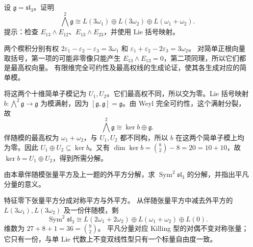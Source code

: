 \begin{exercise}\label{b5:ex:19-adjoint-exterior-square}
	设 \(\mathfrak g=\mathfrak{sl}_3\)。证明
	\[
		\bigwedge^2\mathfrak g \cong L(3\omega_1)\oplus L(3\omega_2)\oplus L(\omega_1+\omega_2).
	\]
	提示：检查 \(E_{13}\wedge E_{12}\)、\(E_{13}\wedge E_{23}\)，并使用 Lie 括号映射。
\end{exercise}
\begin{solution}
	两个楔积分别有权 \(2\varepsilon_1-\varepsilon_2-\varepsilon_3=3\omega_1\) 和 \(\varepsilon_1+\varepsilon_2-2\varepsilon_3=3\omega_2\)。 对简单正根向量取括号，第一项的可能非零像只能产生 \(E_{13}\wedge E_{13}=0\)，第二项同理，所以它们都是最高权向量。 有限维完全可约性及最高权线的生成论证，使其各生成对应的简单模。

	将这两个十维简单子模记为 \(U_1,U_2\)。它们最高权不同，所以交为零。Lie 括号映射 \(b:\bigwedge^2\mathfrak g\to\mathfrak g\) 为模满射，因为 \([\mathfrak g,\mathfrak g]=\mathfrak g\)。由 Weyl 完全可约性，这个满射分裂，故
	\[
		\bigwedge^2\mathfrak g\cong\ker b\oplus\mathfrak g.
	\]
	伴随模的最高权为 \(\omega_1+\omega_2\)，与 \(U_1,U_2\) 都不同构，所以 \(b\) 在这两个简单子模上均为零。因此 \(U_1\oplus U_2\subseteq\ker b\)。又有 \(\dim\ker b=\binom82-8=20=10+10\)，故 \(\ker b=U_1\oplus U_2\)，得到所需分解。
\end{solution}

\begin{exercise}\label{b5:ex:19-adjoint-symmetric-square}
	由本章伴随模张量平方及上一题的外平方分解，求 \(\operatorname{Sym}^2\mathfrak{sl}_3\) 的分解，并指出平凡分量的意义。
\end{exercise}
\begin{solution}
	特征零下张量平方分成对称平方与外平方。 从伴随张量平方中减去外平方的 \(L(3\omega_1),L(3\omega_2)\) 及一份伴随模，剩
	\[
		\operatorname{Sym}^2\mathfrak{sl}_3 \cong L(2\omega_1+2\omega_2)\oplus L(\omega_1+\omega_2)\oplus L(0).
	\]
	维数为 \(27+8+1=36=\binom92\)。 平凡分量对应 Killing 型的对偶不变对称张量；它只有一份，与单 Lie 代数上不变双线性型只有一个标量自由度一致。
\end{solution}
